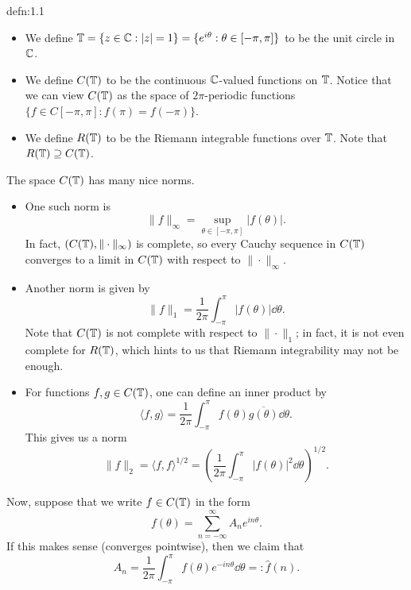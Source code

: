 \begin{defn}{defn:1.1}
    \begin{itemize}
        \item We define $\mathbb{T} = \{z \in \mathbb{C} : |z| = 1\} = 
        \{e^{i\theta} : \theta \in [-\pi, \pi]\}$ to be the unit circle in $\mathbb{C}$. 
        \item We define $C(\mathbb{T})$ to be the continuous $\mathbb{C}$-valued functions 
        on $\mathbb{T}$. Notice that we can view $C(\mathbb{T})$ as the space of
        $2\pi$-periodic functions $\{f \in C[-\pi, \pi] : f(\pi) = f(-\pi)\}$.
        \item We define $R(\mathbb{T})$ to be the Riemann integrable functions 
        over $\mathbb{T}$. Note that $R(\mathbb{T}) \supseteq C(\mathbb{T})$. 
    \end{itemize}
\end{defn}

The space $C(\mathbb{T})$ has many nice norms. 
\begin{itemize}
    \item One such norm is 
    \[ \|f\|_\infty = \sup_{\theta \in [-\pi, \pi]} |f(\theta)|. \] 
    In fact, $(C(\mathbb{T}), \|\cdot\|_\infty)$ is complete, so every 
    Cauchy sequence in $C(\mathbb{T})$ converges to a limit in $C(\mathbb{T})$ with respect to 
    $\|\cdot\|_\infty$.
    \item Another norm is given by 
    \[ \|f\|_1 = \frac{1}{2\pi} \int_{-\pi}^\pi |f(\theta)|\dd\theta. \] 
    Note that $C(\mathbb{T})$ is not complete with respect to $\|\cdot\|_1$; 
    in fact, it is not even complete for $R(\mathbb{T})$, which hints to us that 
    Riemann integrability may not be enough. 
    \item For functions $f, g \in C(\mathbb{T})$, one can define an inner product by 
    \[ \langle f, g \rangle = \frac{1}{2\pi} \int_{-\pi}^\pi f(\theta) 
    \overline{g(\theta)}\dd\theta. \] 
    This gives us a norm 
    \[ \|f\|_2 = \langle f, f \rangle^{1/2} = 
    \left( \frac{1}{2\pi} \int_{-\pi}^\pi |f(\theta)|^2\dd\theta \right)^{\!1/2}. \] 
\end{itemize} 
Now, suppose that we write $f \in C(\mathbb{T})$ in the form 
\[ f(\theta) = \sum_{n=-\infty}^\infty A_n e^{in\theta}. \] 
If this makes sense (converges pointwise), then we claim that 
\[ A_n = \frac{1}{2\pi} \int_{-\pi}^\pi f(\theta) e^{-in\theta}\dd\theta 
=: \hat f(n). \] 

